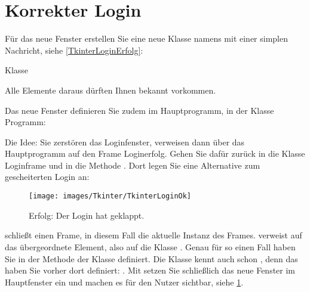 
\section{Korrekter Login}


Für das neue Fenster erstellen Sie eine neue Klasse namens  mit einer simplen Nachricht, siehe \ref{TkinterLoginErfolg}:

\begin{code}
     
    \caption{Klasse }\label{TkinterLoginErfolg}
\end{code}   


Alle Elemente daraus dürften Ihnen bekannt vorkommen.

Das neue Fenster definieren Sie zudem im Hauptprogramm, in der Klasse Programm:

\medskip


\medskip

Die Idee: Sie zerstören das Loginfenster, verweisen dann über das Hauptprogramm auf den Frame Loginerfolg. Gehen Sie dafür zurück in die Klasse Loginframe und in die Methode . Dort legen Sie eine Alternative zum gescheiterten Login an:

\medskip




\medskip


\begin{figure}
    \texttt{[image: images/Tkinter/TkinterLoginOk]}
    \caption{Erfolg: Der Login hat geklappt.} \label{TkinterLoginOk}
\end{figure}



 schließt einen Frame, in diesem Fall die aktuelle Instanz des Frames.  verweist auf das übergeordnete Element, also auf die Klasse . Genau für so einen Fall haben Sie in der Methode  der Klasse   definiert. Die Klasse  kennt auch schon , denn das haben Sie vorher dort definiert: . Mit  setzen Sie schließlich das neue Fenster  im Hauptfenster ein und machen es für den Nutzer sichtbar, siehe \ref{TkinterLoginOk}.

